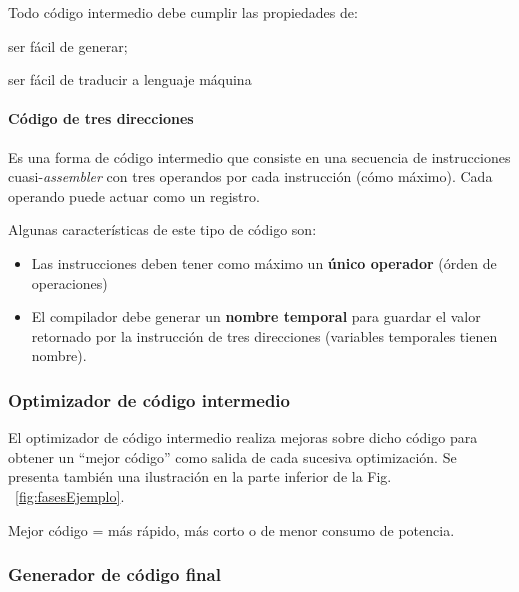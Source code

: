 Todo código intermedio debe cumplir las propiedades de:

    \begin{enumerate*}[label=\itshape\alph*\upshape)]
        \item ser fácil de generar;
        \item ser fácil de traducir a lenguaje máquina
    \end{enumerate*}

\paragraph*{Código de tres direcciones}

    Es una forma de código intermedio que consiste en una secuencia de instrucciones
    cuasi-\emph{assembler} con tres operandos por cada instrucción (cómo máximo). Cada
    operando puede actuar como un registro.

    Algunas características de este tipo de código son:

    \begin{itemize}
        \item Las instrucciones deben tener como máximo un \textbf{único operador} (órden de
        operaciones)
        \item El compilador debe generar un \textbf{nombre temporal} para guardar el valor retornado
        por la instrucción de tres direcciones (variables temporales tienen nombre).
    \end{itemize}


\subsubsection{Optimizador de código intermedio}

    El optimizador de código intermedio realiza mejoras sobre  dicho código para obtener un “mejor código” como salida de
    cada sucesiva optimización. Se presenta también una ilustración en la parte inferior de la Fig. ~\ref{fig:fasesEjemplo}.

    \begin{center}
        Mejor código = más rápido, más corto o de menor consumo de potencia.
    \end{center}

\subsubsection{Generador de código final}

